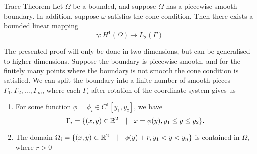 \begin{defn}{Trace Theorem}\label{defn:trace}
    Let $\Omega$ be a bounded, and suppose $\Omega$ has a piecewise smooth boundary. In addition, suppose $\omega$ satisfies the cone condition. Then there exists a bounded linear mapping
    \begin{equation*}
        \gamma : H^1(\Omega) \to L_2(\Gamma)
    \end{equation*}
\end{defn}
\begin{bev}
    The presented proof will only be done in two dimensions, but can be generalised to higher dimensions.
    Suppose the boundary is piecewise smooth, and for the finitely many points where the boundary is not smooth the cone condition is satisfied. We can split the boundary into a finite number of smooth pieces $\Gamma_1, \Gamma_2, \dots, \Gamma_m$, where each $\Gamma_i$ after rotation of the coordinate system gives us

    \begin{enumerate}
        \item For some function $\phi = \phi_i \in C^1[y_1, y_2]$, we have
            \[ \Gamma_i = \{ (x,y) \in \mathbb{R}^2 \quad | \quad x = \phi(y), y_1 \leq y \leq y_2 \}. \]
        \item The domain $\Omega_i = \{ (x,y) \subset \mathbb{R}^2 \quad | \quad \phi(y) + r, y_1 < y < y_n \}$ is contained in $\Omega$, where $r > 0$
    \end{enumerate}
\end{bev}